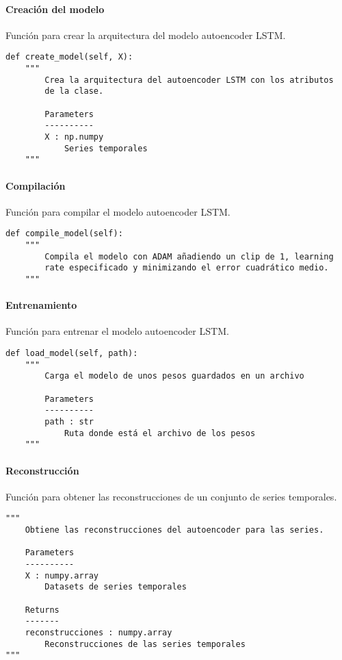 \paragraph{Creación del modelo}

Función para crear la arquitectura del modelo autoencoder LSTM.

\begin{lstlisting}
def create_model(self, X):
    """
        Crea la arquitectura del autoencoder LSTM con los atributos
        de la clase.

        Parameters
        ----------
        X : np.numpy
            Series temporales
    """
\end{lstlisting}

\paragraph{Compilación}

Función para compilar el modelo autoencoder LSTM.

\begin{lstlisting}
def compile_model(self):
    """
        Compila el modelo con ADAM añadiendo un clip de 1, learning
        rate especificado y minimizando el error cuadrático medio.
    """
\end{lstlisting}

\paragraph{Entrenamiento}

Función para entrenar el modelo autoencoder LSTM.

\begin{lstlisting}
def load_model(self, path):
    """
        Carga el modelo de unos pesos guardados en un archivo

        Parameters
        ----------
        path : str
            Ruta donde está el archivo de los pesos
    """
\end{lstlisting}

\paragraph{Reconstrucción}

Función para obtener las reconstrucciones de un conjunto de series temporales.

\begin{lstlisting}
"""
    Obtiene las reconstrucciones del autoencoder para las series.

    Parameters
    ----------
    X : numpy.array
        Datasets de series temporales

    Returns
    -------
    reconstrucciones : numpy.array
        Reconstrucciones de las series temporales
"""
\end{lstlisting}

